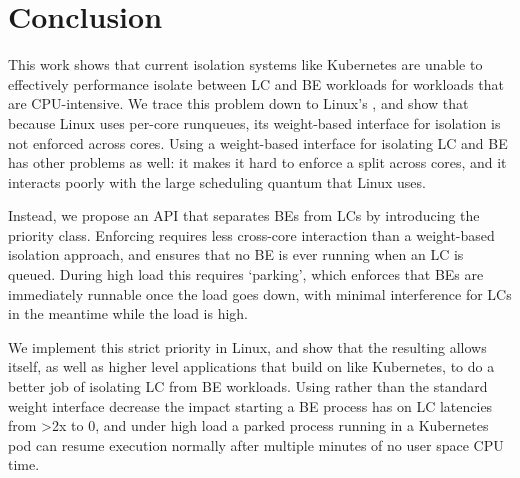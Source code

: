 \section{Conclusion}

This work shows that current isolation systems like Kubernetes are unable to
effectively performance isolate between LC and BE workloads for workloads that
are CPU-intensive. We trace this problem down to Linux's \cgroups{}, and show
that because Linux uses per-core runqueues, its weight-based interface for
isolation is not enforced across cores. Using a weight-based interface for
isolating LC and BE has other problems as well: it makes it hard to enforce a
split across cores, and it interacts poorly with the large scheduling quantum
that Linux uses.

Instead, we propose an API that separates BEs from LCs by introducing the
\beclass{} priority class. Enforcing \beclass{} requires less cross-core
interaction than a weight-based isolation approach, and ensures that no BE is
ever running when an LC is queued. During high load this requires `parking',
which enforces that BEs are immediately runnable once the load goes down, with
minimal interference for LCs in the meantime while the load is high.

We implement this strict priority in Linux, and show that the resulting
\schedbe{} allows \cgroups{} itself, as well as higher level applications that
build on \cgroups{} like Kubernetes, to do a better job of isolating LC from BE
workloads. Using \schedbe{} rather than the standard \cgroups{} weight interface
decrease the impact starting a BE process has on LC latencies from >2x to 0, and
under high load a parked \schedbe{} process running in a Kubernetes pod can
resume execution normally after multiple minutes of no user space CPU time.


